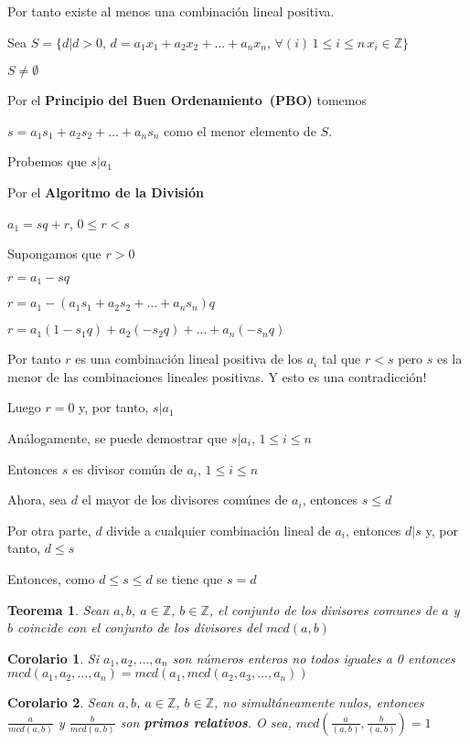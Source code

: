 \documentclass[a4paper,1pt]{report}
\newtheorem*{teo}{Teorema}
\newtheorem*{cor}{Corolario}
\begin{document}
Por tanto existe al menos una combinación lineal positiva.

Sea $S=\{d|d>0,\, d = a_1x_1+a_2x_2+\dots+a_nx_n,\, \forall (i)\, 1\leq i \leq n\, x_i\in\mathbb{Z}\}$

$S\neq \emptyset$

Por el \textbf{Principio del Buen Ordenamiento~(PBO)} tomemos 

$s=a_1s_1+a_2s_2+\dots+a_ns_n$ como el menor elemento de $S$.

Probemos que $s|a_1$

Por el \textbf{Algoritmo de la División}

$a_1=sq+r$, $0\leq r < s$ 

Supongamos que $r>0$

$r=a_1-sq$

$r=a_1 - (a_1s_1+a_2s_2+\dots+a_ns_n)q$

$r=a_1(1-s_1q)+a_2(-s_2q)+\dots+a_n(-s_nq)$

Por tanto $r$ es una combinación lineal positiva de los $a_i$ tal que $r<s$ pero $s$ es la menor de las combinaciones lineales positivas. Y esto es una contradicción! 

Luego $r=0$ y, por tanto, $s|a_1$

Análogamente, se puede demostrar que $s|a_i,\, 1\leq i \leq n$

Entonces $s$ es divisor común de $a_i,\, 1\leq i \leq n$

Ahora, sea $d$ el mayor de los divisores comúnes de $a_i$, entonces $s\leq d$

Por otra parte, $d$ divide a cualquier combinación lineal de $a_i$, entonces $d|s$ y, por tanto, $d\leq s$

Entonces, como $d\leq s \leq d$ se tiene que $s=d$

\begin{teo}
 Sean $a,b$, $a\in\mathbb{Z}$, $b\in\mathbb{Z}$, el conjunto de los divisores comunes de $a$ y $b$ coincide con el conjunto de los divisores del $mcd(a,b)$
\end{teo}

\begin{cor}
 Si $a_1,a_2,\dots,a_n$ son números enteros no todos iguales a 0 entonces $mcd(a_1,a_2,\dots,a_n)=mcd(a_1,mcd(a_2,a_3,\dots,a_n))$
\end{cor}

\begin{cor}
 Sean $a,b$, $a\in\mathbb{Z}$, $b\in\mathbb{Z}$, no simultáneamente nulos, entonces $\frac{a}{mcd(a, b)}$ y  $\frac{b}{mcd(a, b)}$ son \textbf{primos relativos}. O sea, $mcd(\frac{a}{(a, b)},\frac{b}{(a, b)})=1$
\end{cor}
\end{document}
